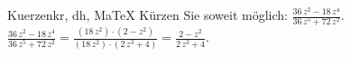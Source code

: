\begin{MAufgabe}{Kuerzen}{kr, dh, MaTeX}
K\"urzen Sie soweit m\"oglich: $\frac{36\, z^2 - 18\, z^4}{36\, z^5 + 72\, z^2}$.\\ 
\ifLsg\MLoesung
\quad $\frac{36\, z^2 - 18\, z^4}{36\, z^5 + 72\, z^2}=\frac{(18\, z^2)\cdot(2 - z^2)}{(18\, z^2)\cdot(2\, z^3 + 4)}=\frac{2 - z^2}{2\, z^3 + 4}$.\else\relax\fi
 \end{MAufgabe}